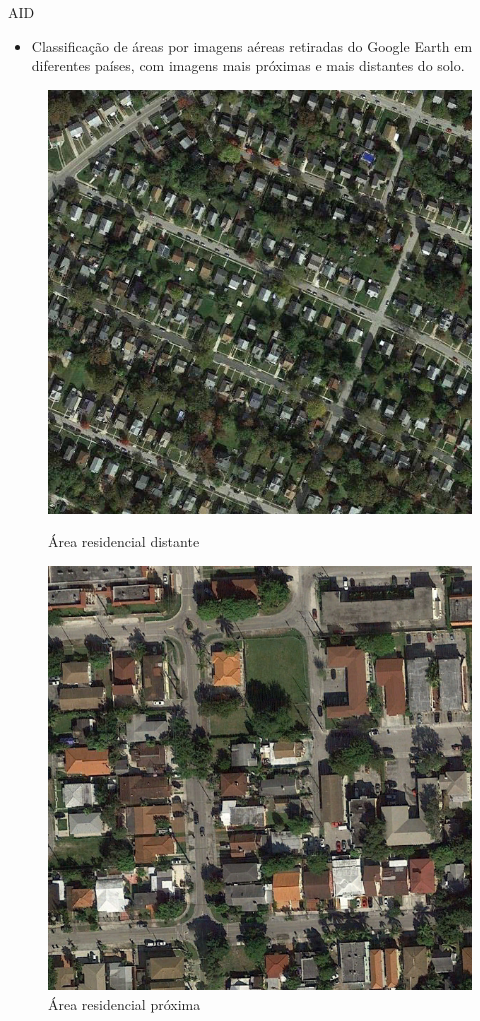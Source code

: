\begin{frame}{AID}
        \begin{itemize}
            \item Classificação de áreas por imagens aéreas retiradas do Google Earth em diferentes países, com imagens mais próximas e mais distantes do solo.
        \end{itemize}
    
        \begin{figure}
            \begin{minipage}[b]{0.45\linewidth}
                \centering
                \includegraphics[width=0.65\linewidth]{AID/denseresidential_163.jpg}
                \caption{Área residencial distante}
            \end{minipage}
            \hspace{0.2cm}
            \begin{minipage}[b]{0.45\linewidth}
                \centering
                \includegraphics[width=0.65\linewidth]{AID/denseresidential_149.jpg}
                \caption{Área residencial próxima}
            \end{minipage}
        \end{figure}
        
    \end{frame}


